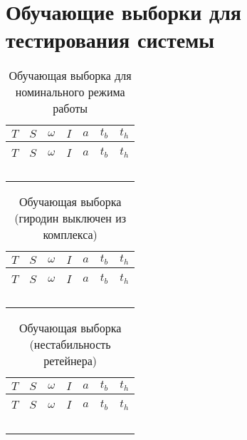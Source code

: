\chapter{Обучающие выборки для тестирования системы}
\label{app:Data}

\begin{longtable}[H]{|C{100pt}|C{80pt}|C{50pt}|C{50pt}|C{50pt}|C{50pt}|C{50pt}|}
\caption{Обучающая выборка для номинального режима работы}
\label{app:Data:Nominal}
\\ \hline
$T$ & $S$ & $\omega$ & $I$ & $a$ & $t_b$ & $t_h$ \\\hline
\endfirsthead
{}
\\ \hline
$T$ & $S$ & $\omega$ & $I$ & $a$ & $t_b$ & $t_h$ \\\hline
\endhead
{}%
\end{longtable}

\begin{longtable}[H]{|C{100pt}|C{80pt}|C{50pt}|C{50pt}|C{50pt}|C{50pt}|C{50pt}|}
\caption{Обучающая выборка (гиродин выключен из комплекса)}
\label{app:Data:Disabled}
\\ \hline
$T$ & $S$ & $\omega$ & $I$ & $a$ & $t_b$ & $t_h$ \\\hline
\endfirsthead
{}
\\ \hline
$T$ & $S$ & $\omega$ & $I$ & $a$ & $t_b$ & $t_h$ \\\hline
\endhead
{}
\end{longtable}

\begin{longtable}[H]{|C{100pt}|C{80pt}|C{50pt}|C{50pt}|C{50pt}|C{50pt}|C{50pt}|}
\caption{Обучающая выборка (нестабильность ретейнера)}
\label{app:Data:RetainerInstability}
\\ \hline
$T$ & $S$ & $\omega$ & $I$ & $a$ & $t_b$ & $t_h$ \\\hline
\endfirsthead
{}
\\ \hline
$T$ & $S$ & $\omega$ & $I$ & $a$ & $t_b$ & $t_h$ \\\hline
\endhead
{}
\end{longtable}

